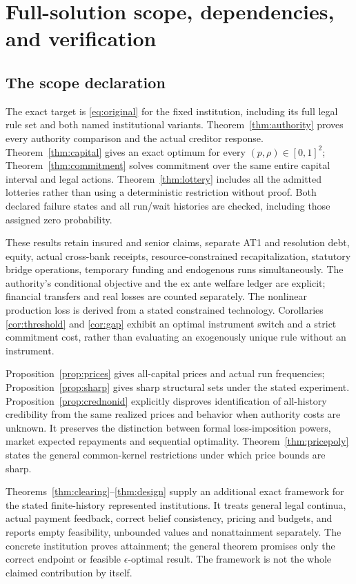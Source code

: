 \documentclass[11pt,a4paper]{article}
\numberwithin{equation}{section}
\theoremstyle{definition}
\begin{document}
\section{Full-solution scope, dependencies, and verification}\label{sec:scope}

\subsection{The scope declaration}
The exact target is \eqref{eq:original} for the fixed institution,
including its full legal rule set and both named institutional variants.
Theorem~\ref{thm:authority} proves every authority comparison and the
actual creditor response. Theorem~\ref{thm:capital} gives an exact optimum
for every \((p,\rho)\in[0,1]^2\); Theorem~\ref{thm:commitment} solves
commitment over the same entire capital interval and legal actions.
Theorem~\ref{thm:lottery} includes all the admitted lotteries rather
than using a deterministic restriction without proof. Both declared
failure states and all run/wait histories are checked, including those
assigned zero probability.

These results retain insured and senior claims, separate AT1 and
resolution debt, equity, actual cross-bank receipts, resource-constrained
recapitalization, statutory bridge operations, temporary funding and
endogenous runs simultaneously. The authority's conditional objective
and the ex ante welfare ledger are explicit; financial transfers and
real losses are counted separately. The nonlinear production loss is
derived from a stated constrained technology. Corollaries
\ref{cor:threshold} and \ref{cor:gap} exhibit an optimal instrument switch
and a strict commitment cost, rather than evaluating an exogenously
unique rule without an instrument.

Proposition~\ref{prop:prices} gives all-capital prices and actual run
frequencies; Proposition~\ref{prop:sharp} gives sharp structural sets
under the stated experiment. Proposition~\ref{prop:crednonid} explicitly
disproves identification of all-history credibility from the same
realized prices and behavior when authority costs are unknown. It
preserves the distinction between formal loss-imposition powers,
market expected repayments and sequential optimality.
Theorem~\ref{thm:pricepoly} states the general common-kernel restrictions
under which price bounds are sharp.

Theorems~\ref{thm:clearing}--\ref{thm:design} supply an additional exact
framework for the stated finite-history represented institutions.
It treats general legal continua, actual payment feedback, correct
belief consistency, pricing and budgets, and reports empty feasibility,
unbounded values and nonattainment separately. The concrete institution
proves attainment; the general theorem promises only the correct
endpoint or feasible \(\epsilon\)-optimal result. The framework is
not the whole claimed contribution by itself.
\end{document}
